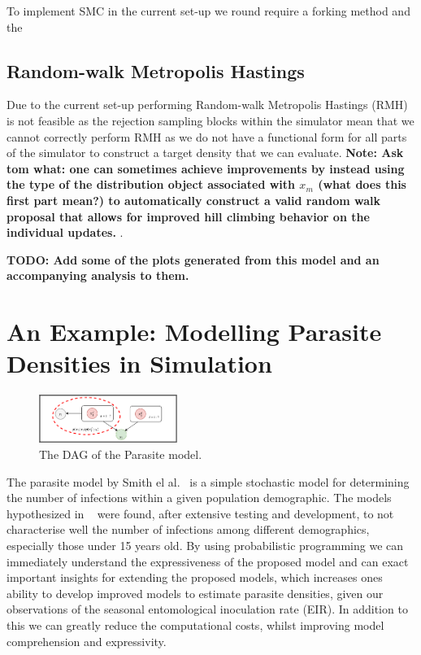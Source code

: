 \documentclass{article}
\begin{document}
To implement SMC in the current set-up we round require a forking method and the 

\subsection{Random-walk Metropolis Hastings}

Due to the current set-up performing Random-walk Metropolis Hastings (RMH) is not feasible 
as the rejection sampling blocks within the simulator mean that we cannot correctly perform RMH
as we do not have a functional form for all parts of the simulator to construct a target density
that we can evaluate. \textbf{Note:
Ask tom what:  one can sometimes achieve improvements by instead using the type of the distribution object 
associated with $x_m$ (what does this first part mean?) 
 to automatically construct a valid random walk proposal that allows for improved
 hill climbing behavior on the individual updates. }. 

\textbf{TODO: Add some of the plots generated from this model and an accompanying analysis to them.}
 

\section{An Example: Modelling Parasite Densities in Simulation}
  \begin{figure}[h!]
    \centering
    \label{fig:parasite}
    \includegraphics[width=0.4\textwidth]{parasite_model.pdf}
    \caption{The DAG of the Parasite model.}
  \end{figure}
The parasite model by Smith el al.~\cite{smith2006relationship} is a simple stochastic 
model for determining the number of infections within a given population demographic.
The models hypothesized in ~\cite{smith2006relationship} were found, 
after extensive testing and development, to not characterise well the number 
of infections among different demographics, especially those under 15 years old. 
By using probabilistic programming we can immediately understand 
the expressiveness of the proposed model and can exact important insights for 
extending the proposed models, which increases ones ability to develop 
improved models to estimate parasite densities, given 
our observations of the seasonal entomological inoculation rate (EIR).
In addition to this we can greatly reduce the computational costs, whilst
improving model comprehension and expressivity.  
\end{document}
